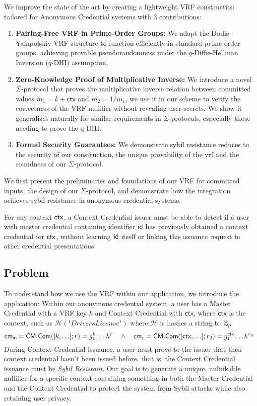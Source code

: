 \noindent We improve the state of the art by creating a lightweight VRF construction tailored for Anonymous Credential systems with 3 contributions:
\begin{enumerate}
        \item \textbf{Pairing-Free VRF in Prime-Order Groups:} We adapt the Dodis-Yampolskiy VRF structure to function efficiently in standard prime-order groups, achieving provable pseudorandomness under the $q$-Diffie-Hellman Inversion ($q$-DHI) assumption.

        \item \textbf{Zero-Knowledge Proof of Multiplicative Inverse:} We introduce a novel $\Sigma$-protocol that proves the multiplicative inverse relation between committed values $m_1 = k + \textsf{ctx}$ and $m_2 = 1/m_1$, we use it in our scheme to verify the correctness of the VRF nullifier without revealing user secrets. We show it generalizes naturally for similar requirements in $\Sigma$-protocols, especially those needing to prove the q-DHI.

         \item \textbf{Formal Security Guarantees:} We demonstrate sybil resistance reduces to the security of our construction, the unique provability of the vrf and the soundness of our $\Sigma$-protocol.
\end{enumerate}
We first present the preliminaries and foundations of our VRF for committed inputs, the design of our $\Sigma$-protocol, and demonstrate how the integration achieves sybil resistance in anonymous credential systems.

\begin{definition}
For any context $\mathsf{ctx}$, a Context Credential issuer must be able to detect if a user with master credential containing identifier $\mathsf{id}$ has previously obtained a context credential for $\mathsf{ctx}$, without learning $\mathsf{id}$ itself or linking this issuance request to other credential presentations.
\end{definition}

\subsection{Problem}
To understand how we use the VRF within our application, we introduce the application:
Within our anonymous credential system, a user has a Master Credential with a VRF key $k$ and Context Credential with $\textsf{ctx}$, where $\textsf{ctx}$ is the context, such as $\mathcal{H}(\textit{"DriversLicense"})$ where $\mathcal{H}$ is hashes a string to $\mathbb{Z}_p$
\[
\mathsf{cm}_{\textsf{m}} = \mathsf{CM.Com}([k, \ldots]; r) = g_1^{k}\ldots h^r \quad \wedge \quad \mathsf{cm}_{\textsf{c}} = \mathsf{CM.Com}([\textsf{ctx}, \ldots]; r_2) = g_1^{\textsf{ctx}} \ldots h^{r_2}
\]
During Context Credential issuance, a user must prove to the issuer that their context credential hasn't been issued before, that is, the Context Credential issuance must be \emph{Sybil Resistant}. Our goal is to generate a unique, unlinkable nullifier for a specific context containing something in both the Master Credential and the Context Credential to protect the system from Sybil attacks while also retaining user privacy.

